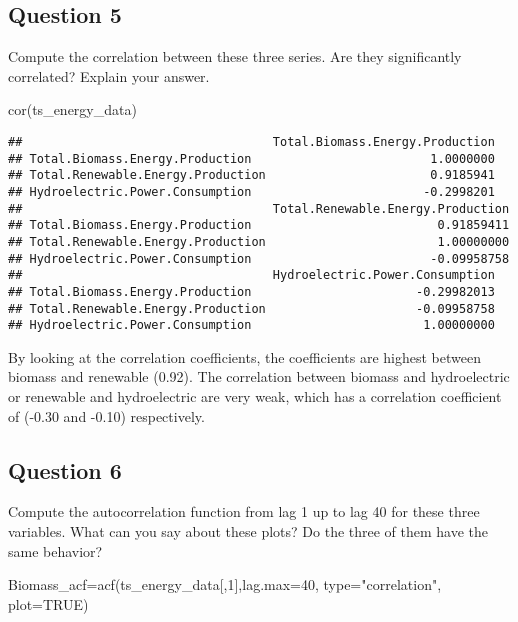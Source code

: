 \documentclass[
]{article}
\newenvironment{Shaded}{\begin{snugshade}}{\end{snugshade}}
\newcommand{\AttributeTok}[1]{\textcolor[rgb]{0.77,0.63,0.00}{#1}}
\newcommand{\ConstantTok}[1]{\textcolor[rgb]{0.00,0.00,0.00}{#1}}
\newcommand{\DecValTok}[1]{\textcolor[rgb]{0.00,0.00,0.81}{#1}}
\newcommand{\FunctionTok}[1]{\textcolor[rgb]{0.00,0.00,0.00}{#1}}
\newcommand{\NormalTok}[1]{#1}
\newcommand{\OtherTok}[1]{\textcolor[rgb]{0.56,0.35,0.01}{#1}}
\newcommand{\StringTok}[1]{\textcolor[rgb]{0.31,0.60,0.02}{#1}}
\begin{document}
\hypertarget{question-5}{%
\subsection{Question 5}\label{question-5}}

Compute the correlation between these three series. Are they
significantly correlated? Explain your answer.

\begin{Shaded}
\begin{Highlighting}[]
\FunctionTok{cor}\NormalTok{(ts\_energy\_data) }
\end{Highlighting}
\end{Shaded}

\begin{verbatim}
##                                   Total.Biomass.Energy.Production
## Total.Biomass.Energy.Production                         1.0000000
## Total.Renewable.Energy.Production                       0.9185941
## Hydroelectric.Power.Consumption                        -0.2998201
##                                   Total.Renewable.Energy.Production
## Total.Biomass.Energy.Production                          0.91859411
## Total.Renewable.Energy.Production                        1.00000000
## Hydroelectric.Power.Consumption                         -0.09958758
##                                   Hydroelectric.Power.Consumption
## Total.Biomass.Energy.Production                       -0.29982013
## Total.Renewable.Energy.Production                     -0.09958758
## Hydroelectric.Power.Consumption                        1.00000000
\end{verbatim}

By looking at the correlation coefficients, the coefficients are highest
between biomass and renewable (0.92). The correlation between biomass
and hydroelectric or renewable and hydroelectric are very weak, which
has a correlation coefficient of (-0.30 and -0.10) respectively.

\hypertarget{question-6}{%
\subsection{Question 6}\label{question-6}}

Compute the autocorrelation function from lag 1 up to lag 40 for these
three variables. What can you say about these plots? Do the three of
them have the same behavior?

\begin{Shaded}
\begin{Highlighting}[]
\NormalTok{Biomass\_acf}\OtherTok{=}\FunctionTok{acf}\NormalTok{(ts\_energy\_data[,}\DecValTok{1}\NormalTok{],}\AttributeTok{lag.max=}\DecValTok{40}\NormalTok{, }\AttributeTok{type=}\StringTok{"correlation"}\NormalTok{, }\AttributeTok{plot=}\ConstantTok{TRUE}\NormalTok{)}
\end{Highlighting}
\end{Shaded}
\end{document}
